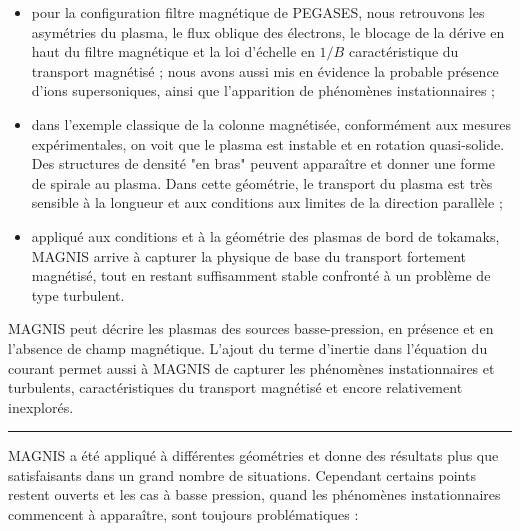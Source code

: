 \begin{itemize}
  \item pour la configuration filtre magnétique de PEGASES, nous retrouvons les
  asymétries du plasma, le flux oblique des électrons, le blocage de la dérive
  en haut du filtre magnétique et la loi d'échelle en $1/B$ caractéristique du
  transport magnétisé ; nous avons aussi mis en évidence la probable présence d'ions
  supersoniques, ainsi que l'apparition de phénomènes instationnaires ;
  \item dans l'exemple classique de la colonne magnétisée, conformément
  aux mesures expérimentales, on voit que le
  plasma est instable et en rotation quasi-solide. Des structures de
  densité "en bras" peuvent apparaître et donner une forme de spirale au
  plasma. Dans cette géométrie, le transport du plasma est très sensible à la
  longueur et aux conditions aux limites de la direction parallèle ;
  \item appliqué aux conditions et à la géométrie des plasmas de bord de
  tokamaks, MAGNIS arrive à capturer la physique de base du transport fortement
  magnétisé, tout en restant suffisamment stable confronté à un problème de type turbulent.
\end{itemize} 

MAGNIS peut décrire les plasmas des sources basse-pression, en présence et en
l'absence de champ magnétique. L'ajout du terme d'inertie dans l'équation du
courant permet aussi à MAGNIS de capturer les phénomènes instationnaires et
turbulents, caractéristiques du transport magnétisé et encore relativement
inexplorés.

\begin{center}
\rule{0.6\textwidth}{1pt}
\end{center}

MAGNIS a été appliqué à différentes géométries et donne des résultats plus que
satisfaisants dans un grand nombre de situations. Cependant certains points
restent ouverts et les cas à basse pression, quand les phénomènes instationnaires
commencent à apparaître, sont toujours problématiques :


